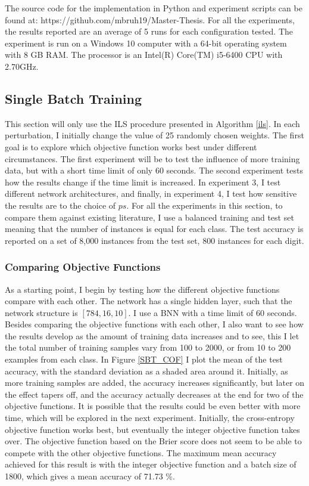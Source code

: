 \noindent The source code for the implementation in Python and experiment scripts can be found at: https://github.com/mbruh19/Master-Thesis. For all the experiments, the results reported are an average of 5 runs for each configuration tested. The experiment is run on a Windows 10 computer with a 64-bit operating system with 8 GB RAM. The processor is an Intel(R) Core(TM) i5-6400 CPU with 2.70GHz. 


\subsection{Single Batch Training}

This section will only use the ILS procedure presented in Algorithm \ref{ils}. In each perturbation, I initially change the value of 25 randomly chosen weights. The first goal is to explore which objective function works best under different circumstances. The first experiment will be to test the influence of more training data, but with a short time limit of only 60 seconds. The second experiment tests how the results change if the time limit is increased. In experiment 3, I test different network architectures, and finally, in experiment 4, I test how sensitive the results are to the choice of $ps$. For all the experiments in this section, to compare them against existing literature, I use a balanced training and test set meaning that the number of instances is equal for each class. The test accuracy is reported on a set of 8,000 instances from the test set, 800 instances for each digit.

\subsubsection{Comparing Objective Functions}

As a starting point, I begin by testing how the different objective functions compare with each other. The network has a single hidden layer, such that the network structure is $[784, 16, 10]$. I use a BNN with a time limit of 60 seconds. Besides comparing the objective functions with each other, I also want to see how the results develop as the amount of training data increases and to see, this I let the total number of training samples vary from 100 to 2000, or from 10 to 200 examples from each class. In Figure \ref{SBT_COF} I plot the mean of the test accuracy, with the standard deviation as a shaded area around it. Initially, as more training samples are added, the accuracy increases significantly, but later on the effect tapers off, and the accuracy actually decreases at the end for two of the objective functions. It is possible that the results could be even better with more time, which will be explored in the next experiment. Initially, the cross-entropy objective function works best, but eventually the integer objective function takes over. The objective function based on the Brier score does not seem to be able to compete with the other objective functions. The maximum mean accuracy achieved for this result is with the integer objective function and a batch size of 1800, which gives a mean accuracy of 71.73 \%. \\

